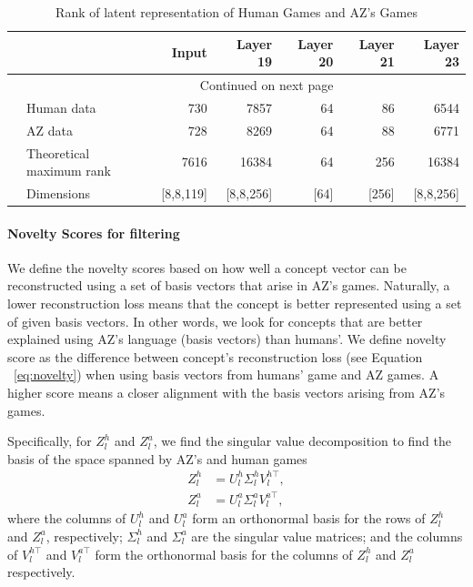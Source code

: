 \documentclass{article}
\begin{document}
\begin{longtable}{llrrrrr} 
\caption{Rank of latent representation of Human Games and AZ's Games}
\label{table:rank} \\ 
\toprule
&   &  Input & Layer 19 & Layer 20 &  Layer 21 &  Layer 23 \\
\midrule
\endhead
\midrule
\multicolumn{5}{r}{{Continued on next page}} \\
\midrule
\endfoot
\bottomrule
\endlastfoot
\multirow{2}{*}{Rank}     &      Human data &   730 &    7857 &  64 &  86 & 6544 \\
    &     AZ data &   728  & 8269 &    64  &  88 & 6771 \\ \midrule 
\multirow{2}{*}{}     & Theoretical maximum rank & 7616 & 16384 & 64 & 256 & 16384 \\ 
    &     Dimensions & [8,8,119] & [8,8,256] & [64] & [256] & [8,8,256] \\ 
\end{longtable}

\paragraph{Novelty Scores for filtering} \label{sec:res_novelty}
We define the novelty scores based on how well a concept vector can be reconstructed using a set of basis vectors that arise in AZ's games. Naturally, a lower reconstruction loss means that the concept is better represented using a set of given basis vectors. In other words, we look for concepts that are better explained using AZ's language (basis vectors) than humans'.
We define novelty score as the difference between concept's reconstruction loss (see Equation ~\ref{eq:novelty}) when using basis vectors from humans' game and AZ games. A higher score means a closer alignment with the basis vectors arising from AZ's games. 

Specifically, for $Z_l^h$ and $Z_l^a$, we find the singular value decomposition to find the basis of the space spanned by AZ's and human games
\begin{align*}
Z_l^h &= U_l^h \Sigma_l^h V_l^{h \top}, \\
Z_l^a &= U_l^a \Sigma_l^a V_l^{a \top},
\end{align*}
where the columns of $U_l^h$ and $U_l^a$ form an orthonormal basis for the rows of $Z_l^h$ and $Z_l^a$, respectively; $\Sigma_l^h$ and $\Sigma_l^a$ are the singular value matrices; and the columns of $V_l^{h \top}$ and $V_l^{a \top}$ form the orthonormal basis for the columns of $Z_l^h$ and $Z_l^a$ respectively.
\end{document}
